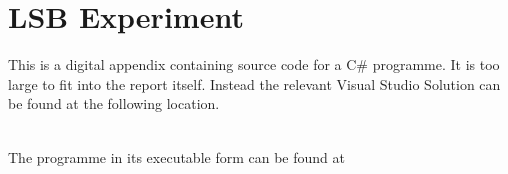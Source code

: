 \chapter{LSB Experiment}
\label{app:A}
This is a digital appendix containing source code for a C\# programme. It is too large to fit into the report itself.
Instead the relevant Visual Studio Solution can be found at the following location.

\setlength{\parindent}{0pt} {
\\

The programme in its executable form can be found at \\
}